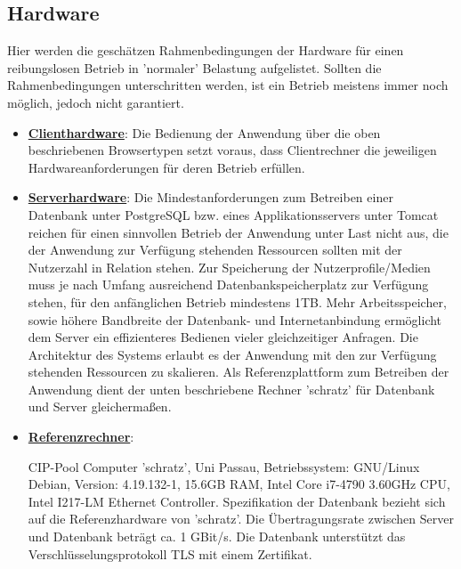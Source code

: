 \documentclass{article}
\begin{document}
\subsection{Hardware}
Hier werden die geschätzen Rahmenbedingungen der Hardware für einen reibungslosen Betrieb in 'normaler' Belastung aufgelistet. Sollten die Rahmenbedingungen unterschritten werden, ist ein Betrieb meistens immer noch möglich, jedoch nicht garantiert.
\begin{itemize}
\item \underline{\textbf{Clienthardware}}: \linebreak
Die Bedienung der Anwendung über die oben beschriebenen Browsertypen setzt voraus, dass Clientrechner die jeweiligen Hardwareanforderungen für deren Betrieb erfüllen.
\item \underline{\textbf{Serverhardware}}: \linebreak
Die Mindestanforderungen zum Betreiben einer Datenbank unter PostgreSQL bzw. eines Applikationsservers unter Tomcat reichen für einen sinnvollen Betrieb der Anwendung unter Last nicht aus, die der Anwendung zur Verfügung stehenden Ressourcen sollten mit der Nutzerzahl in Relation stehen. Zur Speicherung der Nutzerprofile/Medien muss je nach Umfang ausreichend Datenbankspeicherplatz zur Verfügung stehen, für den anfänglichen Betrieb mindestens 1TB. Mehr Arbeitsspeicher, sowie höhere Bandbreite der Datenbank- und Internetanbindung ermöglicht dem Server ein effizienteres Bedienen vieler gleichzeitiger Anfragen. Die Architektur des Systems erlaubt es der Anwendung mit den zur Verfügung stehenden Ressourcen zu skalieren. Als Referenzplattform zum Betreiben der Anwendung dient der unten beschriebene Rechner 'schratz' für Datenbank und Server gleichermaßen.
\item \underline{\textbf{Referenzrechner}}:
\begin{flushleft}
CIP-Pool Computer 'schratz', Uni Passau, Betriebssystem: GNU/Linux Debian, Version: 4.19.132-1, 15.6GB RAM, Intel Core i7-4790 3.60GHz CPU, Intel I217-LM Ethernet Controller. \linebreak
Spezifikation der Datenbank bezieht sich auf die Referenzhardware von 'schratz'. Die Übertragungsrate zwischen Server und Datenbank beträgt ca. 1 GBit/s. Die Datenbank unterstützt das Verschlüsselungsprotokoll TLS mit einem Zertifikat. \linebreak
\end{flushleft}
\end{itemize}
\end{document}
